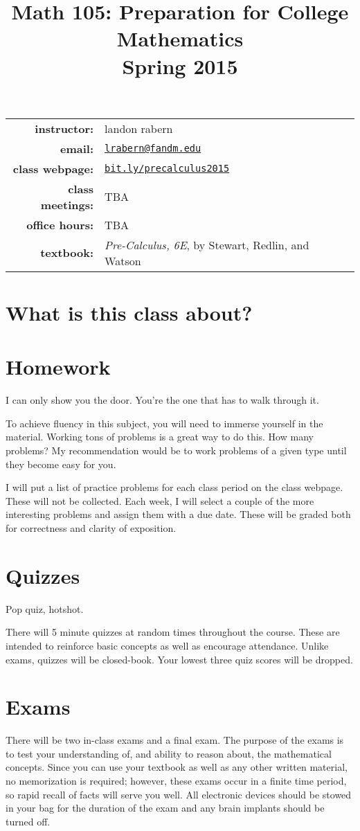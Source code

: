 \documentclass[12pt]{article}
\title{Math 105: Preparation for College Mathematics\\ \bigskip\small{Spring 2015}}
\date{}
\begin{document}
\maketitle

\begin{tabular}{r l}
\textbf{instructor:}& landon rabern\\
\textbf{email:}& \href{mailto:lrabern@fandm.edu}{\nolinkurl{lrabern@fandm.edu}}\\
\textbf{class webpage:}& \href{http://bit.ly/precalculus2015}{\nolinkurl{bit.ly/precalculus2015}}\\
\textbf{class meetings:}& TBA\\
\textbf{office hours:}& TBA\\
\textbf{textbook:}& \textit{Pre-Calculus, 6E}, by Stewart, Redlin, and Watson\\
\end{tabular}

\section*{What is this class about?}

\section*{Homework}
\epigraph{I can only show you the door. You're the one that has to walk through it.}{}
To achieve fluency in this subject, you will need to immerse yourself in the material.  
Working tons of problems is a great way to do this.  How many problems?  
My recommendation would be to work problems of a given type until they become easy for you.

I will put a list of practice problems for each class period on the class webpage.  These will not be collected.  
Each week, I will select a couple of the more interesting problems and assign them with a due date.  
These will be graded both for correctness and clarity of exposition.

\section*{Quizzes}
\epigraph{Pop quiz, hotshot.}{}
There will 5 minute quizzes at random times throughout the course.  
These are intended to reinforce basic concepts as well as encourage attendance.
Unlike exams, quizzes will be closed-book.  Your lowest three quiz scores will be dropped.

\section*{Exams}
There will be two in-class exams and a final exam. 
The purpose of the exams is to test your understanding of, and ability to reason about, the mathematical concepts. Since you can use your textbook as well as any other written material, no memorization is required; however, these exams occur in a finite time period, so rapid recall of facts will serve you well.  All electronic devices should be stowed in your bag for the duration of the exam and any brain implants should be turned off.
\end{document}
